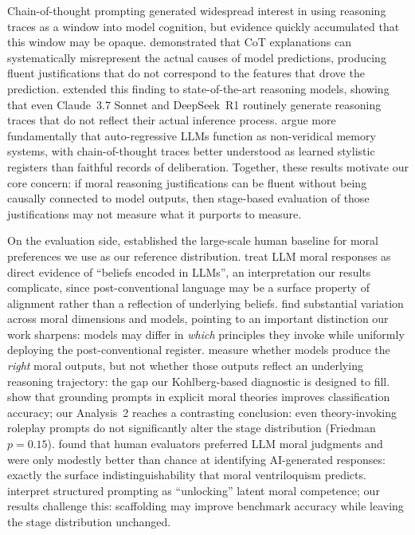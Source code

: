 \documentclass{article}
\begin{document}
Chain-of-thought prompting \citep{wei2022chain} generated widespread interest in using reasoning traces as a window into model cognition, but evidence quickly accumulated that this window may be opaque. \citet{turpin2023language} demonstrated that CoT explanations can systematically misrepresent the actual causes of model predictions, producing fluent justifications that do not correspond to the features that drove the prediction. \citet{chen2025reasoning} extended this finding to state-of-the-art reasoning models, showing that even Claude~3.7 Sonnet and DeepSeek~R1 routinely generate reasoning traces that do not reflect their actual inference process. \citet{kambhampati2024planllms} argue more fundamentally that auto-regressive LLMs function as non-veridical memory systems, with chain-of-thought traces better understood as learned stylistic registers than faithful records of deliberation. Together, these results motivate our core concern: if moral reasoning justifications can be fluent without being causally connected to model outputs, then stage-based evaluation of those justifications may not measure what it purports to measure.

On the evaluation side, \citet{awad2018moral} established the large-scale human baseline for moral preferences we use as our reference distribution. \citet{scherrer2023evaluating} treat LLM moral responses as direct evidence of ``beliefs encoded in LLMs'', an interpretation our results complicate, since post-conventional language may be a surface property of alignment rather than a reflection of underlying beliefs. \citet{ji2025moralbench} find substantial variation across moral dimensions and models, pointing to an important distinction our work sharpens: models may differ in \emph{which} principles they invoke while uniformly deploying the post-conventional register. \citet{jiao2025llmethics} measure whether models produce the \emph{right} moral outputs, but not whether those outputs reflect an underlying reasoning trajectory: the gap our Kohlberg-based diagnostic is designed to fill. \citet{zhou2024rethinking} show that grounding prompts in explicit moral theories improves classification accuracy; our Analysis~2 reaches a contrasting conclusion: even theory-invoking roleplay prompts do not significantly alter the stage distribution (Friedman $p=0.15$). \citet{garcia2024moral} found that human evaluators preferred LLM moral judgments and were only modestly better than chance at identifying AI-generated responses: exactly the surface indistinguishability that moral ventriloquism predicts. \citet{kudina2025structured} interpret structured prompting as ``unlocking'' latent moral competence; our results challenge this: scaffolding may improve benchmark accuracy while leaving the stage distribution unchanged.
\end{document}
